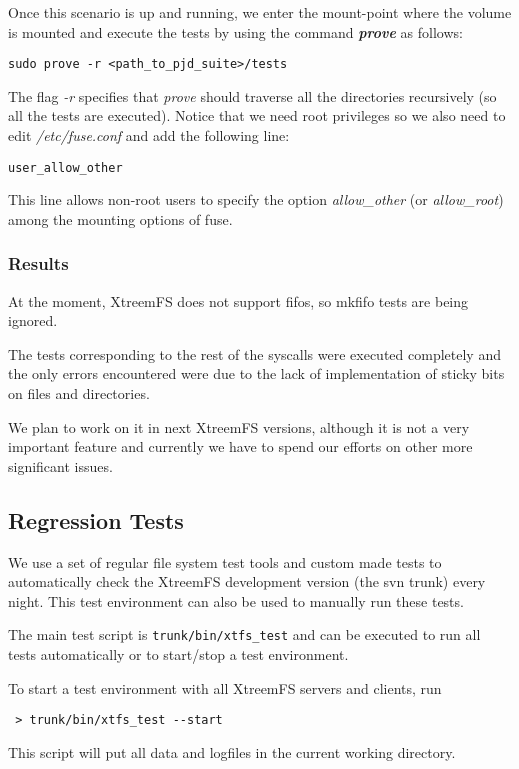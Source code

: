 Once this scenario is up and running, we enter the mount-point where
the volume  is mounted and execute the tests by using the command
\textbf{\textit{prove}} as follows:

\verb"sudo prove -r <path_to_pjd_suite>/tests"

The flag \textit{-r} specifies that \textit{prove} should traverse
all the directories recursively (so all the tests are executed).
Notice that we need root privileges so we also need to edit
\textit{/etc/fuse.conf} and add the following line:

\verb"user_allow_other"

This line allows non-root users to specify the option
\textit{allow\_other} (or \textit{allow\_root})  among the mounting
options of fuse.


\subsubsection{Results}

At the moment, XtreemFS does not support fifos, so mkfifo tests are being ignored.

The tests corresponding to the rest of the syscalls were executed
completely and the only errors encountered were due to the lack of
implementation of sticky bits on files and directories.

We plan to work on it in next XtreemFS versions, although it is not
a very  important feature and currently we have to spend our efforts
on other more significant issues.


\subsection{Regression Tests}
We use a set of regular file system test tools and custom made tests to automatically check the XtreemFS development version (the svn trunk) every night. This test environment can also be used to manually run these tests.

The main test script is \texttt{trunk/bin/xtfs\_test} and can be executed to run all tests automatically or to start/stop a test environment.

To start a test environment with all XtreemFS servers and clients, run

\begin{verbatim}
 > trunk/bin/xtfs_test --start
\end{verbatim}

This script will put all data and logfiles in the current working directory.

